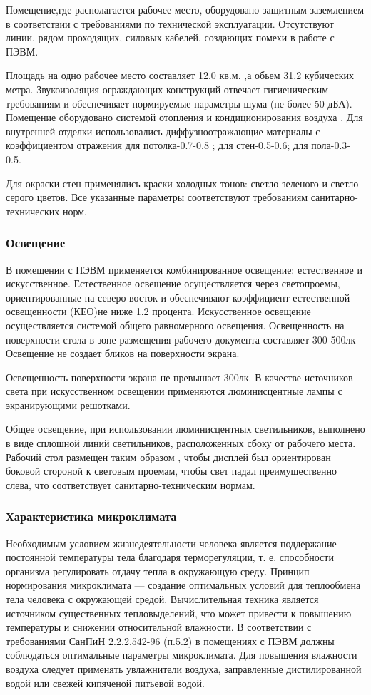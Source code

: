 Помещение,где располагается рабочее место, оборудовано защитным заземлением в соответствии
с требованиями по технической эксплуатации. Отсутствуют линии, рядом проходящих, силовых
кабелей, создающих помехи в работе с ПЭВМ.


Площадь на одно рабочее место  составляет  12.0 кв.м. ,а обьем 31.2 кубических метра.
Звукоизоляция ограждающих конструкций отвечает гигиеническим требованиям и обеспечивает
нормируемые параметры шума (не более 50 дБА). Помещение оборудовано системой отопления и
кондиционирования воздуха . Для внутренней отделки использовались диффузноотражающие
материалы с коэффициентом отражения для потолка-0.7-0.8 ; для стен-0.5-0.6; для пола-0.3-0.5.


Для окраски стен  применялись краски холодных тонов: светло-зеленого и светло-серого цветов.
Все указанные параметры соответствуют  требованиям  санитарно-технических норм.


\subsubsection{Освещение}
В помещении с ПЭВМ  применяется комбинированное освещение: естественное и искусственное.
Естественное освещение осуществляется через светопроемы, ориентированные на  северо-восток
и обеспечивают коэффициент естественной освещенности (КЕО)не ниже 1.2 процента.
Искусственное освещение  осуществляется системой общего равномерного освещения.
Освещенность на поверхности стола в зоне размещения рабочего документа составляет 300-500лк 
Освещение не  создает бликов на поверхности экрана.


Освещенность поверхности экрана не превышает 300лк.  В качестве источников света при искусственном
освещении применяются  люминисцентные лампы с экранирующими решотками.


Общее освещение, при использовании люминисцентных светильников, 
выполнено в виде сплошной линий светильников, расположенных сбоку от рабочего места.
Рабочий стол размещен таким образом , чтобы дисплей был ориентирован боковой стороной к
световым проемам, чтобы свет падал преимущественно слева, что соответствует санитарно-техническим
нормам.



\subsubsection{Характеристика микроклимата}
Необходимым условием жизнедеятельности человека является поддержание постоянной
температуры тела благодаря терморегуляции, т. е. способности 
организма регулировать отдачу тепла в окружающую среду. Принцип нормирования
микроклимата --- создание оптимальных условий для теплообмена тела человека с окружающей
средой. Вычислительная техника является источником существенных тепловыделений, что может
привести к  повышению температуры и снижении относительной влажности.
В соответствии с требованиями СанПиН 2.2.2.542-96  (п.5.2) в помещениях с ПЭВМ  должны
соблюдаться оптимальные параметры микроклимата. Для повышения влажности воздуха следует
применять увлажнители воздуха, заправленные дистилированной водой  или свежей кипяченой
питьевой водой.


